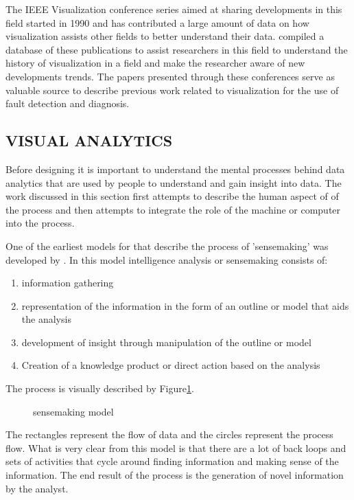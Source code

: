 The IEEE Visualization conference series aimed at sharing developments in this field started in 1990 and has contributed a large amount of data on how visualization assists other fields to better understand their data. \cite{isenberg2016vispubdata} compiled a database of these publications to assist researchers in this field to understand the history of visualization in a field and make the researcher aware of new developments trends. The papers presented through these conferences serve as valuable source to describe previous work related to visualization for the use of fault detection and diagnosis.

\subsection{VISUAL ANALYTICS}

Before designing it is important to understand the mental processes behind data analytics that are used by people to understand and gain insight into data. The work discussed in this section first attempts to describe the human aspect of of the process and then attempts to integrate the role of the machine or computer into the process.

One of the earliest  models for that describe the process of 'sensemaking' was developed by \cite{pirolli2005sensemaking}. In this model intelligence analysis or sensemaking  consists of:
\begin{enumerate}
	\item information gathering
	\item representation of the information in the form of an outline or model that aids the analysis
	\item development of insight through manipulation of the outline or model
	\item Creation of a knowledge product or direct action based on the analysis
\end{enumerate}
The process is visually described by Figure\ref{fig:3}.
\begin{figure}[!ht]
	\centering{}
	\caption{\cite{pirolli2005sensemaking} sensemaking model}\label{fig:3}
\end{figure}

The rectangles represent the flow of data and the circles represent the process flow. What is very clear from this model is that there are a lot of back loops and sets of activities that cycle around finding information and making sense of the information. The end result of the process is the generation of novel information by the analyst.

